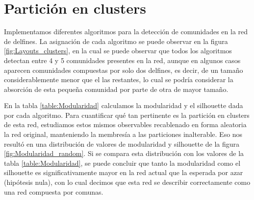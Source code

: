 \section{Partición en clusters}

\par Implementamos diferentes algoritmos para la detección de comunidades en la red de delfines. La asignación de cada algoritmo se puede observar en la figura \ref{fig:Layouts_clusters}, en la cual se puede observar que todos los algoritmos detectan entre 4 y 5 comunidades presentes en la red, aunque en algunos casos aparecen comunidades compuestas por solo dos delfines, es decir, de un tamaño considerablemente menor que el las restantes, lo cual se podría considerar la absorción de esta pequeña comunidad por parte de otra de mayor tamaño.
\par En la tabla \ref{table:Modularidad} calculamos la modularidad y el silhouette dada por cada algoritmo. Para cuantificar qué tan pertinente es la partición en clusters de esta red, estudiamos estos mismos observables recablenado en forma aleatoria la red original, manteniendo la membresía a las particiones inalterable. Eso nos resultó en una distribución de valores de modularidad y silhouette de la figura \ref{fig:Modularidad_random}. Si se compara esta distribución con los valores de la tabla \ref{table:Modularidad}, se puede concluir que tanto la modularidad como el silhouette es significativamente mayor en la red actual que la esperada por azar (hipótesis nula), con lo cual decimos que esta red se describir correctamente como una red compuesta por comunas.

